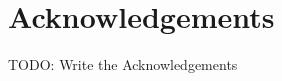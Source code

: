 \section*{Acknowledgements}

TODO: Write the Acknowledgements

\begin{comment}
\noindent \lorem

\vspace{0.3cm}
\noindent \lorem
\end{comment}

\vspace{1cm}
\noindent\textit{\UnivPlace}\\
\noindent\textit{\GraduationDate}
\hfill \AuthorName\ \AuthorSurname
